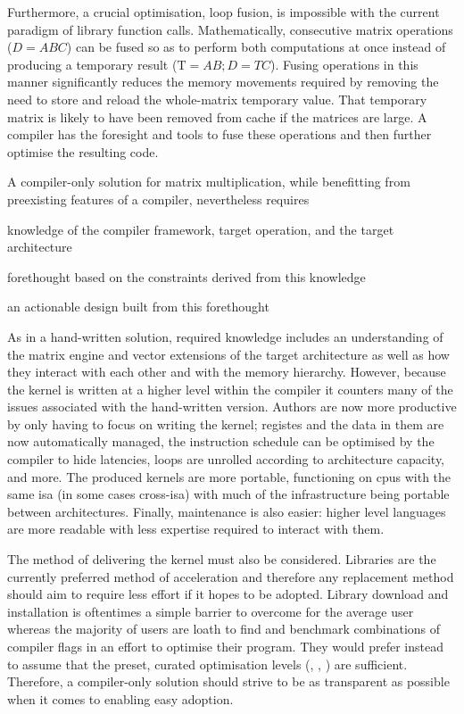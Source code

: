 \documentclass[\main/thesis.tex]{subfiles}
\begin{document}
Furthermore, a crucial optimisation, loop fusion, is impossible with the current paradigm of library function calls.
Mathematically, consecutive matrix operations (\eg $D = ABC$) can be fused so as to perform both computations at once instead of producing a temporary result (\ie $\text{T}=AB;D=TC$).
Fusing operations in this manner significantly reduces the memory movements required by removing the need to store and reload the whole-matrix temporary value. That temporary matrix is likely to have been removed from cache if the matrices are large.
A compiler has the foresight and tools to fuse these operations and then further optimise the resulting code.

A compiler-only solution for matrix multiplication, while benefitting from preexisting features of a compiler, nevertheless requires
\begin{enumerate*}[itemjoin={{; }}, itemjoin*={{; and }}, label={}, afterlabel={}, after={.}]
  \item knowledge of the compiler framework, target operation, and the target architecture
  \item forethought based on the constraints derived from this knowledge
  \item an actionable design built from this forethought
\end{enumerate*}
As in a hand-written solution, required knowledge includes an understanding of the matrix engine and vector extensions of the target architecture as well as how they interact with each other and with the memory hierarchy.
However, because the kernel is written at a higher level within the compiler it counters many of the issues associated with the hand-written version.
Authors are now more productive by only having to focus on writing the kernel; registes and the data in them are now automatically managed, the instruction schedule can be optimised by the compiler to hide latencies, loops are unrolled according to architecture capacity, and more.
The produced kernels are more portable, functioning on \glspl{cpu} with the same \gls{isa} (in some cases cross-\gls{isa}) with much of the infrastructure being portable between architectures.
Finally, maintenance is also easier: higher level languages are more readable with less expertise required to interact with them.

The method of delivering the kernel must also be considered.
Libraries are the currently preferred method of acceleration and therefore any replacement method should aim to require less effort if it hopes to be adopted.
Library download and installation is oftentimes a simple barrier to overcome for the average user whereas the majority of users are loath to find and benchmark combinations of compiler flags in an effort to optimise their program.
They would prefer instead to assume that the preset, curated optimisation levels (\ie {}, , ) are sufficient.
Therefore, a compiler-only solution should strive to be as transparent as possible when it comes to enabling easy adoption.
\end{document}
